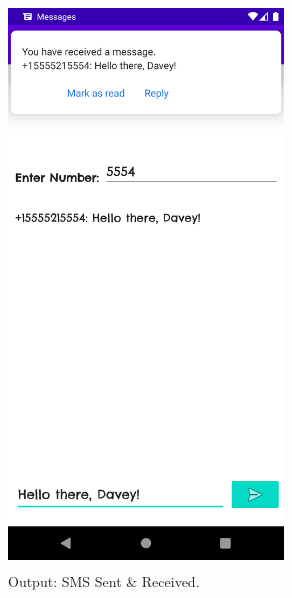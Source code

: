 \documentclass[12pt, a4]{article}
\begin{document}
\subsection*{}
\begin{figure}[h]
\centering
\caption{Output: SMS Sent \& Received.}
\includegraphics[height=15cm, width=7.3cm]{SMS/Screenshots/Output-2.png}
\end{figure}

\newpage
\end{document}
